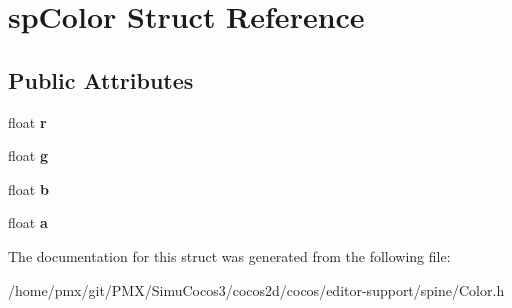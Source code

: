 \hypertarget{structspColor}{}\section{sp\+Color Struct Reference}
\label{structspColor}
\subsection*{Public Attributes}
\begin{DoxyCompactItemize}
\item 
\mbox{\label{structspColor_a3e7f1e79ee33bece8a70e70b667dac69}} 
float {\bfseries r}
\item 
\mbox{\label{structspColor_ab1e5037dc6d3f8f3242b6499ee19e924}} 
float {\bfseries g}
\item 
\mbox{\label{structspColor_a90a370d6073b66ff3a54eba38bfe4317}} 
float {\bfseries b}
\item 
\mbox{\label{structspColor_a0d504b7026bda84096c94a05a317437c}} 
float {\bfseries a}
\end{DoxyCompactItemize}


The documentation for this struct was generated from the following file\+:\begin{DoxyCompactItemize}
\item 
/home/pmx/git/\+P\+M\+X/\+Simu\+Cocos3/cocos2d/cocos/editor-\/support/spine/Color.\+h\end{DoxyCompactItemize}
